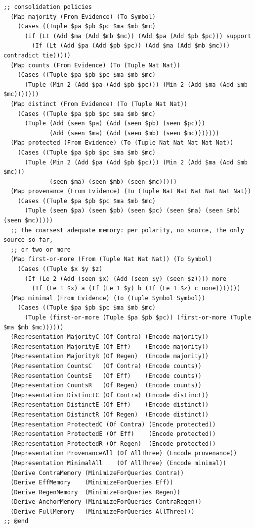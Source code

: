 \documentclass[11pt]{article}
\theoremstyle{definition}
\theoremstyle{plain}
\begin{document}
\begin{lstlisting}[style=mettafull]
  ;; consolidation policies
  (Map majority (From Evidence) (To Symbol)
    (Cases ((Tuple $pa $pb $pc $ma $mb $mc)
      (If (Lt (Add $ma (Add $mb $mc)) (Add $pa (Add $pb $pc))) support
        (If (Lt (Add $pa (Add $pb $pc)) (Add $ma (Add $mb $mc))) contradict tie)))))
  (Map counts (From Evidence) (To (Tuple Nat Nat))
    (Cases ((Tuple $pa $pb $pc $ma $mb $mc)
      (Tuple (Min 2 (Add $pa (Add $pb $pc))) (Min 2 (Add $ma (Add $mb $mc)))))))
  (Map distinct (From Evidence) (To (Tuple Nat Nat))
    (Cases ((Tuple $pa $pb $pc $ma $mb $mc)
      (Tuple (Add (seen $pa) (Add (seen $pb) (seen $pc)))
             (Add (seen $ma) (Add (seen $mb) (seen $mc)))))))
  (Map protected (From Evidence) (To (Tuple Nat Nat Nat Nat Nat))
    (Cases ((Tuple $pa $pb $pc $ma $mb $mc)
      (Tuple (Min 2 (Add $pa (Add $pb $pc))) (Min 2 (Add $ma (Add $mb $mc)))
             (seen $ma) (seen $mb) (seen $mc)))))
  (Map provenance (From Evidence) (To (Tuple Nat Nat Nat Nat Nat Nat))
    (Cases ((Tuple $pa $pb $pc $ma $mb $mc)
      (Tuple (seen $pa) (seen $pb) (seen $pc) (seen $ma) (seen $mb) (seen $mc)))))
  ;; the coarsest adequate memory: per polarity, no source, the only source so far,
  ;; or two or more
  (Map first-or-more (From (Tuple Nat Nat Nat)) (To Symbol)
    (Cases ((Tuple $x $y $z)
      (If (Le 2 (Add (seen $x) (Add (seen $y) (seen $z)))) more
        (If (Le 1 $x) a (If (Le 1 $y) b (If (Le 1 $z) c none)))))))
  (Map minimal (From Evidence) (To (Tuple Symbol Symbol))
    (Cases ((Tuple $pa $pb $pc $ma $mb $mc)
      (Tuple (first-or-more (Tuple $pa $pb $pc)) (first-or-more (Tuple $ma $mb $mc))))))
  (Representation MajorityC (Of Contra) (Encode majority))
  (Representation MajorityE (Of Eff)    (Encode majority))
  (Representation MajorityR (Of Regen)  (Encode majority))
  (Representation CountsC   (Of Contra) (Encode counts))
  (Representation CountsE   (Of Eff)    (Encode counts))
  (Representation CountsR   (Of Regen)  (Encode counts))
  (Representation DistinctC (Of Contra) (Encode distinct))
  (Representation DistinctE (Of Eff)    (Encode distinct))
  (Representation DistinctR (Of Regen)  (Encode distinct))
  (Representation ProtectedC (Of Contra) (Encode protected))
  (Representation ProtectedE (Of Eff)    (Encode protected))
  (Representation ProtectedR (Of Regen)  (Encode protected))
  (Representation ProvenanceAll (Of AllThree) (Encode provenance))
  (Representation MinimalAll    (Of AllThree) (Encode minimal))
  (Derive ContraMemory (MinimizeForQueries Contra))
  (Derive EffMemory    (MinimizeForQueries Eff))
  (Derive RegenMemory  (MinimizeForQueries Regen))
  (Derive AnchorMemory (MinimizeForQueries ContraRegen))
  (Derive FullMemory   (MinimizeForQueries AllThree)))
;; @end


\end{lstlisting}
\end{document}
